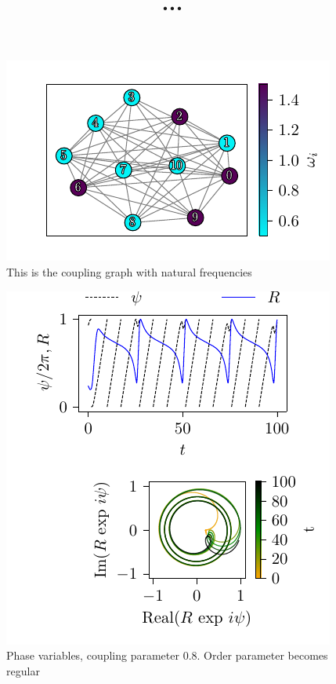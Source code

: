 \documentclass[twocolumn]{article}
\begin{document}
\title{...}
\author{}
\maketitle

\blindtext[2]


\begin{figure}
\centering
\includegraphics[scale=1]{graph}
\caption{This is the coupling graph with natural frequencies}
\end{figure}

\blindtext[2]

\begin{figure}
\centering
\includegraphics[scale=1]{orderParameter080}
\caption{Phase variables, coupling parameter $0.8$. Order parameter becomes regular}
\end{figure}
\end{document}
